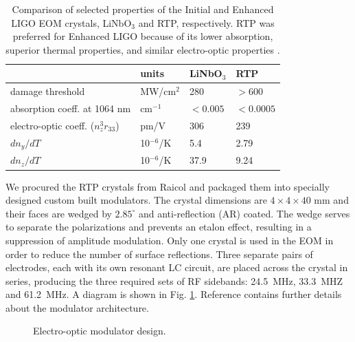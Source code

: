 \begin{table}
\centering
\caption[Comparison of selected properties of the Initial and Enhanced
 LIGO EOM crystals]{Comparison of selected properties of the Initial and Enhanced
 LIGO EOM crystals, LiNbO$_3$ and RTP, respectively. RTP was
 preferred for Enhanced LIGO because of its lower absorption,
 superior thermal properties, and similar 
 electro-optic properties \citep{UFLIGOGroup2006Upgrading}.}  
\begin{tabular}{l l l l}
\hline
 & units & LiNbO$_3$ & RTP \\
\hline
damage threshold & MW/cm$^2$ & 280 & $>600$ \\
absorption coeff. at 1064 nm & cm$^{-1}$ & $< 0.005$ & $< 0.0005$ \\
electro-optic coeff. ($n_z^3 r_{33}$) & pm/V & 306 & 239 \\
$dn_y/dT$ & 10$^{-6}$/K & 5.4 & 2.79 \\
$dn_z/dT$ & 10$^{-6}$/K & 37.9 & 9.24 \\
\hline
\end{tabular}
\label{tab:EOMcrystals}
\end{table}

We procured the RTP crystals from Raicol and packaged them into
specially designed custom built modulators. The crystal dimensions are
$4 \times 4 \times 40$ mm and their faces are wedged by $2.85^\circ$
and anti-reflection (AR) coated. The wedge serves to separate the
polarizations and prevents an etalon effect, resulting in a
suppression of amplitude modulation. Only one crystal is used in the
EOM in order to reduce the number of surface reflections. Three
separate pairs of electrodes, each with its own resonant LC circuit,
are placed across the crystal in series, producing the three required
sets of RF sidebands: 24.5~MHz, 33.3~MHZ and 61.2~MHz. A diagram is
shown in Fig. \ref{fig:EOM}. Reference
\citep{Quetschke2008ElectroOptic} contains further details about the
modulator architecture.

\begin{figure}
\begin{centering}
\caption[Electro-optic modulator design]{Electro-optic modulator
  design.}
\label{fig:EOM}
\end{centering}
\end{figure}

